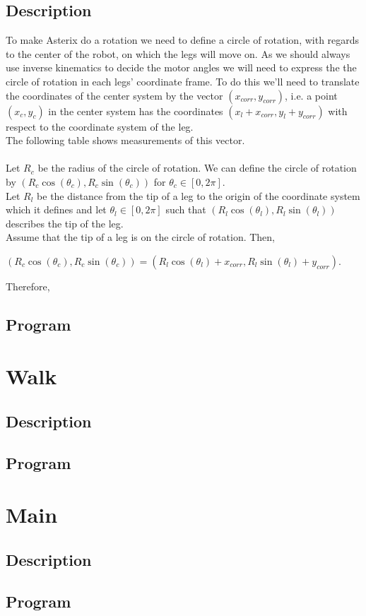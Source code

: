 \documentclass[11pt, a4paper]{article}
\newcommand{\coord}[2]{\left(#1,#2\right)}
\begin{document}
\subsection{Description}
To make Asterix do a rotation we need to define a circle of rotation, with regards to the center of the robot, on which the legs will move on.
As we should always use inverse kinematics to decide the motor angles we will need to express the the circle of rotation in each legs' coordinate frame. To do this we'll need to translate the coordinates of the center system by the vector $(x_{corr}, y_{corr})$, i.e. a point $\left(x_c,y_c\right)$ in the center system has the coordinates $\left(x_l + x_{corr},y_l+y_{corr}\right)$ with respect to the coordinate system of the leg.\\ 
The following table shows measurements of this vector. \\
\vspace{0.5cm}
\\
Let $R_c$ be the radius of the circle of rotation. We can define the circle of rotation by $\left(R_c \cos(\theta_c), R_c \sin(\theta_c)\right)$ for $\theta_c \in \left[0,2\pi\right]$.\\
Let $R_l$ be the distance from the tip of a leg to the origin of the coordinate system which it defines and let $\theta_l \in \left[0,2\pi\right]$ such that $\left(R_l \cos(\theta_l), R_l \sin(\theta_l)\right)$ describes the tip of the leg.\\
Assume that the tip of a leg is on the circle of rotation. Then, \\
\begin{center}
$\coord{R_c\cos(\theta_c)}{R_c\sin(\theta_c)} = \coord{R_l\cos(\theta_l)+x_{corr}}{R_l\sin(\theta_l)+y_{corr}}$.
\end{center}
Therefore, 
\subsection{Program}

\clearpage
\section{Walk}
\subsection{Description}
\subsection{Program}

\clearpage
\section{Main}
\subsection{Description}
\subsection{Program}

\clearpage

\vspace{1.5cm}
\end{document}
